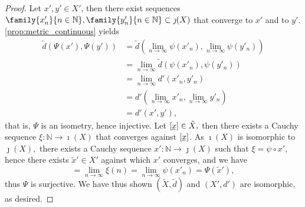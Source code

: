 \begin{proof}
    Let \(x', y' \in X'\), then there exist sequences \(\family{x'_n}{n \in \mathbb{N}}, \family{y'_n}{n \in \mathbb{N}} \subset \jmath(X)\) that converge to \(x'\) and to \(y'\). \cref{prop:metric_continuous} yields
    \begin{align*}
        \tilde{d}(\Psi(x'), \Psi(y')) &= \tilde{d}(\lim_{n\to\infty}{\psi(x'_n)}, \lim_{n\to\infty}{\psi(y'_n)})\\
                                      &= \lim_{n\to\infty}{\tilde{d}(\psi(x'_n), \psi(y'_n))}\\
                                      &= \lim_{n\to\infty}{d'(x'_n, y'_n)}\\
                                      &= d'(\lim_{n\to\infty}{x'_n}, \lim_{n\to\infty}{y'_n})\\
                                      &= d'(x', y'),
    \end{align*}
    that is, \(\Psi\) is an isometry, hence injective. Let \([\sequnder{x}] \in \tilde{X},\) then there exists a Cauchy sequence \(\xi : \mathbb{N} \to \imath(X)\) that converges against \([\sequnder{x}]\). As \(\imath(X)\) is isomorphic to \(\jmath(X),\) there exists a Cauchy sequence \(x' : \mathbb{N} \to \jmath(X)\) such that \(\xi = \psi \circ x'\), hence there exists \(\tilde{x}' \in X'\) against which \(x'\) converges, and we have
    \begin{equation*}
        [\sequnder{x}] = \lim_{n\to\infty}{\xi(n)}= \lim_{n\to\infty}{\psi(x'_n)}= \Psi(\tilde{x}'),
    \end{equation*}
    thus \(\Psi\) is surjective. We have thus shown \((\tilde{X}, \tilde{d})\) and \((X', d')\) are isomorphic, as desired.
\end{proof}

